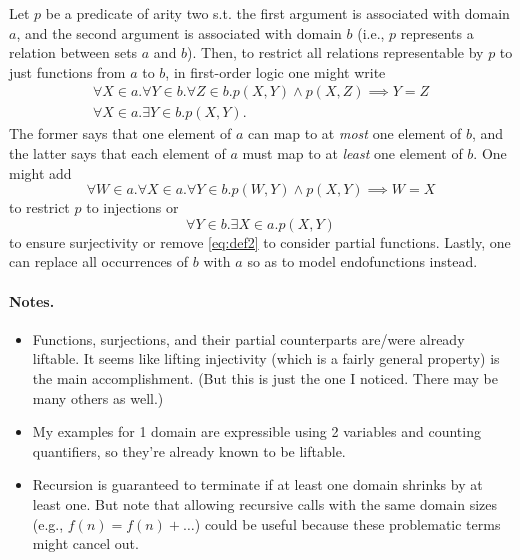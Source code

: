 Let $p$ be a predicate of arity two s.t. the first argument is associated with
domain $a$, and the second argument is associated with domain $b$ (i.e., $p$
represents a relation between sets $a$ and $b$). Then, to restrict all relations
representable by $p$ to just functions from $a$ to $b$, in first-order logic one
might write
\begin{gather}
  \forall X \in a. \forall Y \in b. \forall Z \in b. p(X, Y) \land p(X, Z) \implies Y = Z \label{eq:def1} \\
  \forall X \in a. \exists Y \in b. p(X, Y). \label{eq:def2}
\end{gather}
The former says that one element of $a$ can map to at \emph{most} one element of
$b$, and the latter says that each element of $a$ must map to at \emph{least}
one element of $b$. One might add
\begin{equation} \label{eq:injectivity}
  \forall W \in a. \forall X \in a. \forall Y \in b. p(W, Y) \land p(X, Y) \implies W = X
\end{equation}
to restrict $p$ to injections or
\begin{equation}
  \forall Y \in b. \exists X \in a. p(X, Y)
\end{equation}
to ensure surjectivity or remove \cref{eq:def2} to consider partial functions.
Lastly, one can replace all occurrences of $b$ with $a$ so as to model
endofunctions instead.

\paragraph{Notes.}
\begin{itemize}
  \item Functions, surjections, and their partial counterparts are/were already
        liftable. It seems like lifting injectivity (which is a fairly general
        property) is the main accomplishment. (But this is just the one I
        noticed. There may be many others as well.)
  \item My examples for 1 domain are expressible using 2 variables and counting
        quantifiers, so they're already known to be liftable.
  \item Recursion is guaranteed to terminate if at least one domain shrinks by
        at least one. But note that allowing recursive calls with the same
        domain sizes (e.g., $f(n) = f(n) + \dots$) could be useful because these
        problematic terms might cancel out.
\end{itemize}

